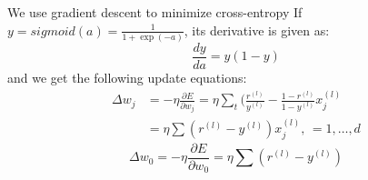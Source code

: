 \begin{description}
        We use gradient descent to minimize cross-entropy 
        If $y = sigmoid(a) = \frac{1}{1 + \exp(-a)}$, its derivative is given as:
        \[ \frac{dy}{da} = y(1-y) \]
        and we get the following update equations:
        \begin{align*}
            \Delta w_j & = -\eta \frac{\partial E}{\partial w_j} = \eta \sum_t
            ({\frac{r^{(l)}}{y^{(l)}}} - \frac{1-r^{(l)}}{1-y^{(l)}}x^{(l)}_j \\
            & = \eta \sum(r^{(l)} - y^{(l)}) x^{(l)}_j\mbox{, }= 1,\dots, d 
        \end{align*}
        \[
            \Delta w_0 = -\eta \frac{\partial E}{\partial w_0} = \eta\sum(r^{(l)} -
            y^{(l)}) 
        \]
\end{description}
